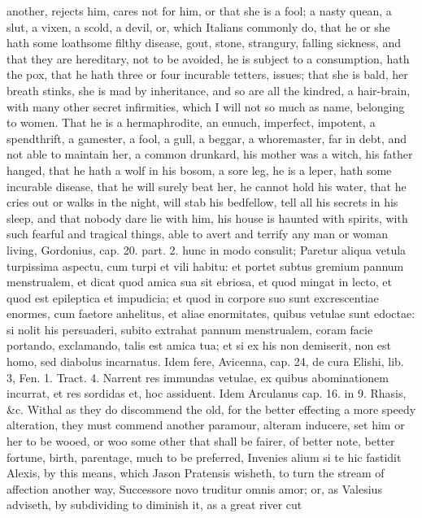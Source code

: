 {another, rejects him, cares not for him, or that she is a fool; a nasty
quean, a slut, a vixen, a scold, a devil, or, which Italians commonly
do, that he or she hath some loathsome filthy disease, gout, stone,
strangury, falling sickness, and that they are hereditary, not to be
avoided, he is subject to a consumption, hath the pox, that he hath
three or four incurable tetters, issues; that she is bald, her breath
stinks, she is mad by inheritance, and so are all the kindred, a
hair-brain, with many other secret infirmities, which I will not so
much as name, belonging to women. That he is a hermaphrodite, an
eunuch, imperfect, impotent, a spendthrift, a gamester, a fool, a gull,
a beggar, a whoremaster, far in debt, and not able to maintain her, a
common drunkard, his mother was a witch, his father hanged, that he
hath a wolf in his bosom, a sore leg, he is a leper, hath some
incurable disease, that he will surely beat her, he cannot hold his
water, that he cries out or walks in the night, will stab his
bedfellow, tell all his secrets in his sleep, and that nobody dare lie
with him, his house is haunted with spirits, with such fearful and
tragical things, able to avert and terrify any man or woman living,
Gordonius, cap. 20. part. 2. hunc in modo consulit; Paretur aliqua
vetula turpissima aspectu, cum turpi et vili habitu: et portet subtus
gremium pannum menstrualem, et dicat quod amica sua sit ebriosa, et
quod mingat in lecto, et quod est epileptica et impudicia; et quod in
corpore suo sunt excrescentiae enormes, cum faetore anhelitus, et aliae
enormitates, quibus vetulae sunt edoctae: si nolit his persuaderi,
subito extrahat pannum menstrualem, coram facie portando,
exclamando, talis est amica tua; et si ex his non demiserit, non est
homo, sed diabolus incarnatus. Idem fere, Avicenna, cap. 24, de cura
Elishi, lib. 3, Fen. 1. Tract. 4. Narrent res immundas vetulae, ex
quibus abominationem incurrat, et res sordidas et, hoc assiduent.
Idem Arculanus cap. 16. in 9. Rhasis, \&c.
Withal as they do discommend the old, for the better effecting a more
speedy alteration, they must commend another paramour, alteram
inducere, set him or her to be wooed, or woo some other that shall be
fairer, of better note, better fortune, birth, parentage, much to be
preferred,  Invenies alium si te hic fastidit Alexis, by this
means, which Jason Pratensis wisheth, to turn the stream of affection
another way, Successore novo truditur omnis amor; or, as Valesius
adviseth, by subdividing to diminish it, as a great river cut
}
